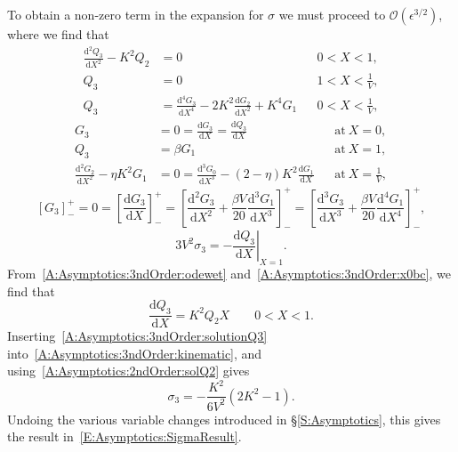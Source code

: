 \documentclass{jfm}
\newcommand{\dd}[2]{\frac{\mathrm{d} #1}{\mathrm{d} #2}}
\newcommand{\poisson}{\eta} %
\begin{document}
To obtain a non-zero term in the expansion for $\sigma$ we must proceed to $\mathcal{O}(\epsilon^{3/2})$, where we find that
\begin{align}
 \dd{^2 Q_3}{X^2} - K^2 Q_2 &= 0 & &0 < X<1,\label{A:Asymptotics:3ndOrder:odewet}\\
Q_3 &= 0 & &1 < X< \frac{1}{V},\\
Q_3 &= \dd{^4 G_3}{X^4} - 2K^2\dd{G_2}{X^2}+ K^4 G_1 & & 0 < X < \frac{1}{V},
\end{align}
\begin{align}
G_3 &= 0 = \dd{G_3}{X}= \dd{Q_3}{X} & &\text{at}~X = 0,\label{A:Asymptotics:3ndOrder:x0bc}\\
Q_3 &=\beta G_1 & &\text{at}~X = 1,\label{A:Asymptotics:3ndOrder:PressureBC}\\
\dd{^2 G_2}{X^2} - \poisson K^2 G_1 &=0 = \dd{^3 G_0}{X^3}  - (2- \poisson)K^2 \dd{G_1}{X}& &\text{at}~X = \frac{1}{V},
\end{align}
\begin{equation}
\left[G_3\right]_-^+ =0 = \left[\dd{G_3}{X}\right]_-^+ = \left[\dd{^2 G_3}{X^2} + \frac{\beta V}{20}\dd{^3G_1}{X^3}\right]_-^+ = \left[\dd{^3 G_3}{X^3} + \frac{\beta V}{20}\dd{^4 G_1}{X^4}\right]_-^+,
\end{equation}
\begin{equation}\label{A:Asymptotics:3ndOrder:kinematic}
3V^2 \sigma_3 = -\left.\dd{Q_3}{X}\right|_{X=1}.
\end{equation}
From~\eqref{A:Asymptotics:3ndOrder:odewet} and~\eqref{A:Asymptotics:3ndOrder:x0bc}, we find that
\begin{equation}\label{A:Asymptotics:3ndOrder:solutionQ3}
\dd{Q_3}{X} = K^2 Q_2 X \qquad 0 < X < 1.
\end{equation}
Inserting~\eqref{A:Asymptotics:3ndOrder:solutionQ3} into~\eqref{A:Asymptotics:3ndOrder:kinematic}, and using~\eqref{A:Asymptotics:2ndOrder:solQ2} gives
\begin{equation}\label{A:Asymptotics:3ndOrder:solutionsigma3}
\sigma_3  = -\frac{K^2}{6V^2}\left(2K^2 - 1\right).
\end{equation}
Undoing the various variable changes introduced in \S\ref{S:Asymptotics}, this gives the result in~\eqref{E:Asymptotics:SigmaResult}.




\end{document}
